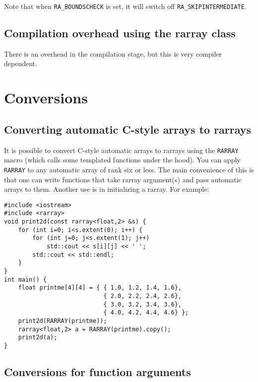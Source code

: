 \documentclass[11pt,twoside]{article}
\begin{document}
Note that when \texttt{RA\_BOUNDSCHECK} is set, it will switch off \texttt{RA\_SKIPINTERMEDIATE}.

\subsection{Compilation overhead using the rarray class}

There is an overhead in the compilation stage, but this is very compiler dependent.

\section{Conversions}

\subsection{Converting automatic C-style arrays to rarrays}

It is possible to convert C-style automatic arrays to rarrays using the {\tt RARRAY} macro (which calls some templated functions under the hood).  You can apply {\tt RARRAY} to any automatic array of rank six or less. 
The main convenience of this is that one can write functions that take rarray argument(s) and pass automatic arrays to them. Another use is in initializing a rarray. For example:
\vspace{-5pt}\begin{framed}\vspace{-14pt}%
\begin{verbatim}
#include <iostream>
#include <rarray>
void print2d(const rarray<float,2> &s) {
    for (int i=0; i<s.extent(0); i++) {
        for (int j=0; j<s.extent(1); j++)
            std::cout << s[i][j] << ' ';
        std::cout << std::endl;
    }
}
int main() {
    float printme[4][4] = { { 1.0, 1.2, 1.4, 1.6},
                            { 2.0, 2.2, 2.4, 2.6},
                            { 3.0, 3.2, 3.4, 3.6},
                            { 4.0, 4.2, 4.4, 4.6} };
    print2d(RARRAY(printme));
    rarray<float,2> a = RARRAY(printme).copy();
    print2d(a);
}
\end{verbatim}%
\vspace{-14pt}\end{framed}\vspace{-8pt}



\subsection{Conversions for function arguments}
\end{document}
